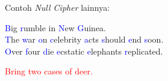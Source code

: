 \documentclass{article}
\begin{document}

Contoh \textit{Null Cipher} lainnya:

\textcolor{blue}{B}ig \textcolor{blue}{r}umble in \textcolor{blue}{N}ew \textcolor{blue}{G}uinea.\\
\textcolor{blue}{T}he \textcolor{blue}{w}ar \textcolor{blue}{o}n \textcolor{blue}{c}elebrity \textcolor{blue}{a}cts \textcolor{blue}{s}hould \textcolor{blue}{e}nd \textcolor{blue}{s}oon.\\
\textcolor{blue}{O}ver \textcolor{blue}{f}our \textcolor{blue}{d}ie \textcolor{blue}{e}cstatic \textcolor{blue}{e}lephants \textcolor{blue}{r}eplicated.

\vspace{5mm}

\textcolor{red}{Bring two cases of deer.}
\end{document}
